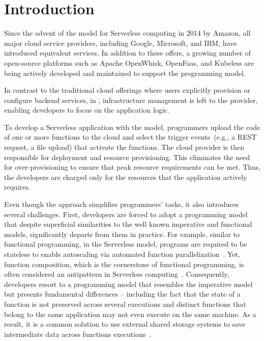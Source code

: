
\section{Introduction}

Since the advent of the \faas model for Serverless computing in 2014  
by Amazon,
all major cloud service providers, including 
Google,
Microsoft,
and IBM,
have introduced equivalent services. 
%
In addition to these offers, a growing number of open-source platforms 
such as Apache OpenWhisk,
OpenFaas,
and Kubeless
are being actively developed and maintained to support the \faas programming model.

In contrast to the traditional cloud offerings where users explicitly provision or configure 
backend services, in \faas, infrastructure management is left to the provider, enabling 
developers to focus on the application logic. 

To develop a Serverless application with the \faas model, programmers upload the code 
of one or more functions to the cloud and select the trigger events~(e.g., a REST request, 
a file upload) that activate the functions. The cloud provider is then responsible for 
deployment and resource provisioning. This eliminates the need for over-provisioning 
to ensure that peak resource requirements can be met.
Thus, the developers are charged only for the resources that the application actively requires.

Even though the \faas approach simplifies programmers' tasks, 
it also introduces several challenges.
First, developers are forced to adopt a programming model that despite superficial 
similarities to the well known imperative and functional models,
significantly departs from them in practice.
For example, similar to functional programming, in the Serverless model, 
programs are required to be stateless
to enable autoscaling via automated function parallelization~\cite{hellerstein2018serverless}.
Yet, function composition, which is the cornerstone of functional programming,
is often considered an antipattern in Serverless computing~\cite{baldini2017serverless}.
%
Consequently, developers resort to a programming model that 
resembles the imperative model but presents fundamental 
differences -- including the fact that the state of a function is not 
preserved across several executions and
distinct functions that belong to the same application may not even execute 
on the same machine. As a result, it is a common solution 
to use external shared storage systems 
to save intermediate data across functions 
executions~\cite{klimovic2018understanding}.


